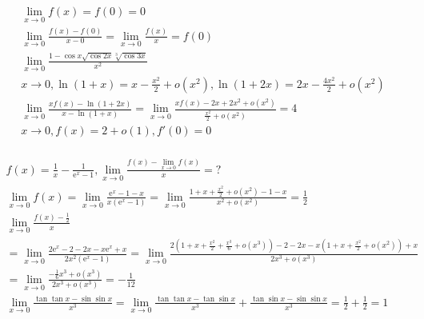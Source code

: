 \documentclass{article}
\begin{document}
\begin{align*}
    \lim_{x \to 0} f(x) = f(0) = 0 \\
    \lim_{x \to 0} \frac{f(x)-f(0)}{x-0} = \lim_{x \to 0} \frac{f(x)}{x} = f(0) \\
    \lim_{x \to 0} \frac{1-\cos x \sqrt{\cos 2x}\sqrt[3]{\cos 3x}}{x^2} \\
    x \to 0 , \ln(1+x) = x - \frac{x^2}{2} + o(x^2) , \ln(1+2x) = 2x - \frac{4x^2}{2} + o(x^2) \\
    \lim_{x \to 0} \frac{xf(x)-\ln(1+2x)}{x-\ln(1+x)} = \lim_{x \to 0} \frac{xf(x)-2x+2x^2+o(x^2)}{\frac{x^2}{2}+o(x^2)} = 4 \\
    x \to 0 ,f(x) = 2 + o(1) , f'(0) = 0 \\ 
\end{align*}

\clearpage
\begin{align*}
    f(x) = \frac{1}{x} - \frac{1}{\mathrm{e}^{x}-1} , \lim_{x \to 0}\frac{f(x)-\lim_{x \to 0}f(x)}{x} = ? \\ 
    \lim_{x \to 0}f(x) = \lim_{x \to 0} \frac{\mathrm{e}^{x}-1-x}{x(\mathrm{e}^{x}-1)} = \lim_{x \to 0} \frac{1+x+\frac{x^2}{2}+o(x^2)-1-x}{x^2 +o(x^2)} = \frac{1}{2} \\
    \lim_{x \to 0} \frac{ f(x) - \frac{1}{2}}{x} \\
    = \lim_{x \to 0} \frac{2\mathrm{e}^{x}-2-2x-x\mathrm{e}^{x}+x}{2x^2 (\mathrm{e}^{x}-1)} = \lim_{x \to 0} \frac{2(1+x+\frac{x^2}{2}+\frac{x^3}{6}+o(x^3))-2-2x-x(1+x+\frac{x^2}{2}+o(x^2))+x}{2x^3+o(x^3)} \\
    = \lim_{x \to 0} \frac{-\frac{1}{6}x^3+o(x^3)}{2x^3+o(x^3)} = -\frac{1}{12} \\
    \lim_{x \to 0} \frac{\tan \tan x - \sin \sin x}{x^3} = \lim_{x \to 0} \frac{\tan \tan x - \tan \sin x }{x^3} + \frac{ \tan \sin x - \sin \sin x}{x^3} = \frac{1}{2} + \frac{1}{2} = 1\\
\end{align*}
\end{document}
